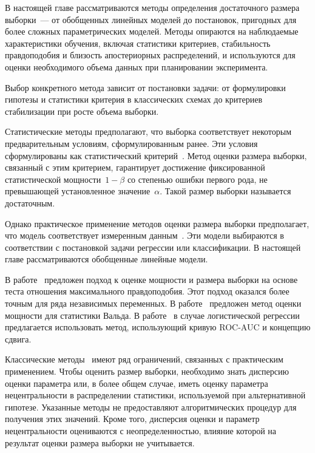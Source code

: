 В настоящей главе рассматриваются методы определения достаточного размера выборки~--- от обобщенных линейных моделей до постановок, пригодных для более сложных параметрических моделей. Методы опираются на наблюдаемые характеристики обучения, включая статистики критериев, стабильность правдоподобия и близость апостериорных распределений, и используются для оценки необходимого объема данных при планировании эксперимента.

Выбор конкретного метода зависит от постановки задачи: от формулировки гипотезы и статистики критерия в классических схемах до критериев стабилизации при росте объема выборки.

Статистические методы предполагают, что выборка соответствует некоторым предварительным условиям, сформулированным ранее. Эти условия сформулированы как статистический критерий~\cite{self1988,self1992,shieh2000,demidenko2007}. Метод оценки размера выборки, связанный с этим критерием, гарантирует достижение фиксированной статистической мощности~$1-\beta$ со степенью ошибки первого рода, не превышающей установленное значение~$\alpha$. Такой размер выборки называется достаточным.

Однако практическое применение методов оценки размера выборки предполагает, что модель соответствует измеренным данным~\cite{kloek1975}. Эти модели выбираются в соответствии с постановкой задачи регрессии или классификации. В настоящей главе рассматриваются обобщенные линейные модели.

В работе~\cite{self1992} предложен подход к оценке мощности и размера выборки на основе теста отношения максимального правдоподобия. Этот подход оказался более точным для ряда независимых переменных. В работе~\cite{shieh2005} предложен метод оценки мощности для статистики Вальда. В работе~\cite{motrenko2014} в случае логистической регрессии предлагается использовать метод, использующий кривую ROC-AUC и концепцию сдвига.

Классические методы~\cite{self1988,self1992,shieh2000,shieh2005,demidenko2007} имеют ряд ограничений, связанных с практическим применением. Чтобы оценить размер выборки, необходимо знать дисперсию оценки параметра или, в более общем случае, иметь оценку параметра нецентральности в распределении статистики, используемой при альтернативной гипотезе. Указанные методы не предоставляют алгоритмических процедур для получения этих значений. Кроме того, дисперсия оценки и параметр нецентральности оцениваются с неопределенностью, влияние которой на результат оценки размера выборки не учитывается.

